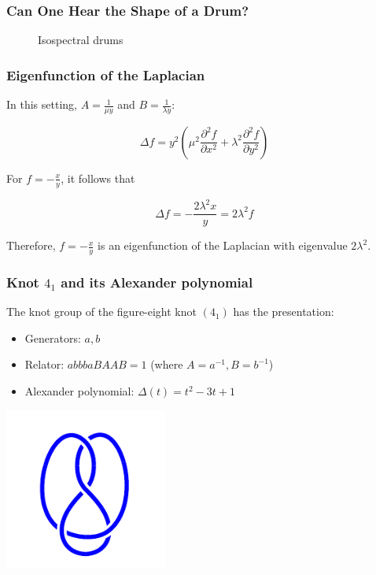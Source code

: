 \documentclass[aspectratio=169]{beamer}
\begin{document}
\begin{frame}
    \frametitle{Can One Hear the Shape of a Drum?}
    \begin{figure}[ht]\centering
    \caption{Isospectral drums}
    \end{figure}
\end{frame}

\begin{frame}
    \frametitle{Eigenfunction of the Laplacian}
    In this setting, \(A = \frac{1}{\mu y}\) and \(B = \frac{1}{\lambda y}\):

    \[
        \Delta f = y^2 \left(\mu^2 \frac{\partial^2 f}{\partial x^2} + \lambda^2 \frac{\partial^2 f}{\partial y^2}\right)
    \]

    For \(f = -\frac{x}{y}\), it follows that

    \[
        \Delta f = - \frac{2 \lambda^2 x}{y} = 2 \lambda^2 f
    \]

    Therefore, \(f = -\frac{x}{y}\) is an eigenfunction of the Laplacian with eigenvalue \(2\lambda^2\).
\end{frame}

\begin{frame}
    \frametitle{Knot $4_1$ and its Alexander polynomial}
    The knot group of the figure-eight knot $(4_1)$ has the presentation:
    \begin{itemize}
        \item Generators: $a, b$
        \item Relator: $abbbaBAAB = 1$ (where $A=a^{-1}, B=b^{-1}$)
        \item Alexander polynomial: $\Delta(t) = t^2 - 3t + 1$
    \end{itemize}
    \begin{center}
        \includegraphics[width=0.4\textwidth]{../images/knot_4_1}
    \end{center}
\end{frame}
\end{document}
